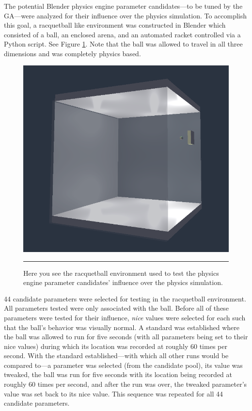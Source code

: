 The potential Blender physics engine parameter candidates---to be tuned by the GA---were analyzed for their influence over the physics simulation. To accomplish this goal, a racquetball like environment was constructed in Blender which consisted of a ball, an enclosed arena, and an automated racket controlled via a Python script. See Figure \ref{fig:racquetball}. Note that the ball was allowed to travel in all three dimensions and was completely physics based.

\begin{figure}[htbp]
\centering
\includegraphics[scale=0.4]{../Figures/Chapter4/racquetball.png}
\rule{35em}{0.5pt}
\caption[Physics Engine Parameter Influence Racquetball Environment]{Here you see the racquetball environment used to test the physics engine parameter candidates' influence over the physics simulation.}
\label{fig:racquetball}
\end{figure}

44 candidate parameters were selected for testing in the racquetball environment. All parameters tested were only associated with the ball. Before all of these parameters were tested for their influence, \textit{nice} values were selected for each such that the ball's behavior was visually normal. A standard was established where the ball was allowed to run for five seconds (with all parameters being set to their nice values) during which its location was recorded at roughly 60 times per second. With the standard established---with which all other runs would be compared to---a parameter was selected (from the candidate pool), its value was tweaked, the ball was run for five seconds with its location being recorded at roughly 60 times per second, and after the run was over, the tweaked parameter's value was set back to its nice value. This sequence was repeated for all 44 candidate parameters.

